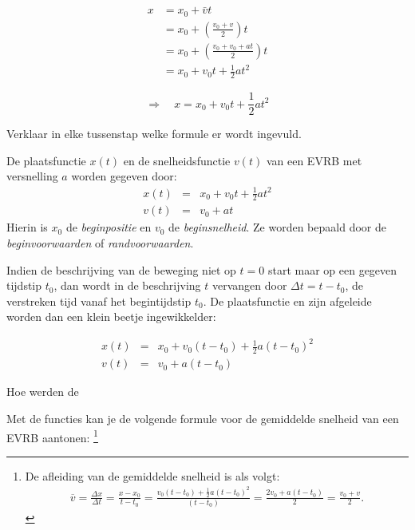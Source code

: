 \documentclass{ximera}
\begin{document}
\begin{align*}
	x &= x_0 + \bar{v}t \\
	  &= x_0 + \left( \frac{v_0 + v}{2} \right)t \\
	  &= x_0 + \left( \frac{v_0 + v_0 + at}{2} \right)t \\
	  &= x_0 + v_0 t + \frac{1}{2} at^2
\end{align*}

\[
\Rightarrow \quad x = x_0 + v_0 t + \frac{1}{2}at^2 
\]

\begin{quickquestion}
	Verklaar in elke tussenstap welke formule er wordt ingevuld. 
\end{quickquestion}


\begin{theorem}
De plaatsfunctie $x(t)$ en de snelheidsfunctie $v(t)$ van een EVRB met versnelling $a$ worden gegeven door:
\[
\begin{array}{rcl}
x(t)&=&x_0+v_0t+\frac{1}{2}at^2\\
v(t)&=&v_0+at
\end{array}
\]
Hierin is $x_0$ de \textit{beginpositie} en $v_0$ de \textit{beginsnelheid}. Ze worden bepaald door de \textit{beginvoorwaarden} of \textit{randvoorwaarden}.
\end{theorem}	

Indien de beschrijving van de beweging niet op $t=0$ start maar op een gegeven tijdstip $t_0$, dan wordt in de beschrijving $t$ vervangen door $\Delta t= t-t_0$, de verstreken tijd vanaf het begintijdstip $t_0$. De plaatsfunctie en zijn afgeleide worden dan een klein beetje ingewikkelder:

\[
\begin{array}{rcl}
x(t)&=&x_0+v_0(t-t_0)+\frac{1}{2}a(t-t_0)^2\\
v(t)&=&v_0+a(t-t_0)
\end{array}
\]



\begin{exercise}
	Hoe werden de 
\end{exercise}





Met de functies kan je de volgende formule voor de gemiddelde snelheid van een EVRB aantonen:%
\footnote{De afleiding van de gemiddelde snelheid is als volgt:
\begin{eqnarray*}
\overline{v}=\frac{\Delta x}{\Delta t}=\frac{x-x_0}{t-t_0}=\frac{v_0(t-t_0)+\frac{1}{2}a(t-t_0)^2}{(t-t_0)}=\frac{2v_0+a(t-t_0)}{2}=\frac{v_0+v}{2}.
\end{eqnarray*}}
\end{document}

